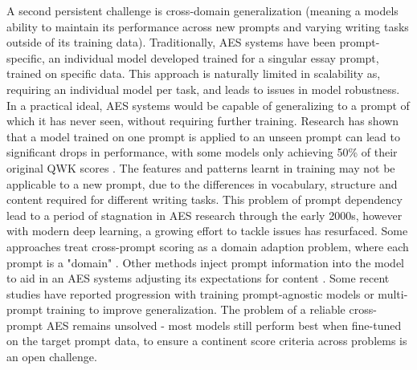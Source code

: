 \documentclass[8pt]{report}
\begin{document}
A second persistent challenge is cross-domain generalization (meaning a models ability to maintain its performance across new prompts and varying writing tasks outside of its training data). Traditionally, AES 
systems have been prompt-specific, an individual model developed trained for a singular essay prompt, trained on specific data. This approach is naturally limited in scalability as, requiring an individual model per 
task, and leads to issues in model robustness. In a practical ideal, AES systems would be capable of generalizing to a prompt of which it has never seen, without requiring further training. Research has shown that a model 
trained on one prompt is applied to an unseen prompt can lead to significant drops in performance, with some models only achieving 50\% of their original QWK scores \parencite{blanchard2013toefl}. The features and patterns learnt in training 
may not be applicable to a new prompt, due to the differences in vocabulary, structure and content required for different writing tasks. This problem of prompt dependency lead to a period of stagnation in AES research through the early 2000s, 
however with modern deep learning, a growing effort to tackle issues has resurfaced. Some approaches treat cross-prompt scoring as a domain adaption problem, where each prompt is a "domain" \parencite{litman2024fairness}. Other methods inject 
prompt information into the model to aid in an AES systems adjusting its expectations for content \parencite{blanchard2013toefl}. Some recent studies have reported progression with training prompt-agnostic models or multi-prompt training 
to improve generalization. The problem of a reliable cross-prompt AES remains unsolved - most models still perform best when fine-tuned on the target prompt data, to ensure a continent score criteria across problems is an open challenge. 
\end{document}
